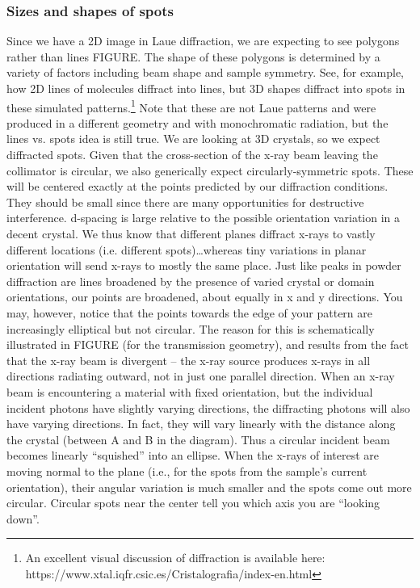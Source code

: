 \subsubsection{Sizes and shapes of spots}
Since we have a 2D image in Laue diffraction, we are expecting to see polygons rather than lines FIGURE. The shape of these polygons is determined by a variety of factors including beam shape and sample symmetry. See, for example, how 2D lines of molecules diffract into lines, but 3D shapes diffract into spots in these simulated patterns.\footnote{An excellent visual discussion of diffraction is available here: https://www.xtal.iqfr.csic.es/Cristalografia/index-en.html } Note that these are not Laue patterns and were produced in a different geometry and with monochromatic radiation, but the lines vs. spots idea is still true.
We are looking at 3D crystals, so we expect diffracted spots. Given that the cross-section of the x-ray beam leaving the collimator is circular, we also generically expect circularly-symmetric spots. These will be centered exactly at the points predicted by our diffraction conditions. They should be small since there are many opportunities for destructive interference.
d-spacing is large relative to the possible orientation variation in a decent crystal. We thus know that different planes diffract x-rays to vastly different locations (i.e. different spots)…whereas tiny variations in planar orientation will send x-rays to mostly the same place. Just like peaks in powder diffraction are lines broadened by the presence of varied crystal or domain orientations, our points are broadened, about equally in x and y directions.
You may, however, notice that the points towards the edge of your pattern are increasingly elliptical but not circular. The reason for this is schematically illustrated in FIGURE (for the transmission geometry), and results from the fact that the x-ray beam is divergent – the x-ray source produces x-rays in all directions radiating outward, not in just one parallel direction. 
When an x-ray beam is encountering a material with fixed orientation, but the individual incident photons have slightly varying directions, the diffracting photons will also have varying directions. In fact, they will vary linearly with the distance along the crystal (between A and B in the diagram). Thus a circular incident beam becomes linearly “squished” into an ellipse. When the x-rays of interest are moving normal to the plane (i.e., for the spots from the sample’s current orientation), their angular variation is much smaller and the spots come out more circular. Circular spots near the center tell you which axis you are “looking down”.
